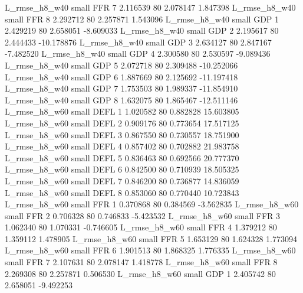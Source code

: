  L_rmse_h8_w40      small      FFR                 7 2.116539 80       2.078147           1.847398
 L_rmse_h8_w40      small      FFR                 8 2.292712 80       2.257871           1.543096
 L_rmse_h8_w40      small      GDP                 1 2.429219 80       2.658051          -8.609033
 L_rmse_h8_w40      small      GDP                 2 2.195617 80       2.444433         -10.178876
 L_rmse_h8_w40      small      GDP                 3 2.634127 80       2.847167          -7.482520
 L_rmse_h8_w40      small      GDP                 4 2.300580 80       2.530597          -9.089436
 L_rmse_h8_w40      small      GDP                 5 2.072718 80       2.309488         -10.252066
 L_rmse_h8_w40      small      GDP                 6 1.887669 80       2.125692         -11.197418
 L_rmse_h8_w40      small      GDP                 7 1.753503 80       1.989337         -11.854910
 L_rmse_h8_w40      small      GDP                 8 1.632075 80       1.865467         -12.511146
 L_rmse_h8_w60      small     DEFL                 1 1.020582 80       0.882828          15.603805
 L_rmse_h8_w60      small     DEFL                 2 0.909176 80       0.773654          17.517125
 L_rmse_h8_w60      small     DEFL                 3 0.867550 80       0.730557          18.751900
 L_rmse_h8_w60      small     DEFL                 4 0.857402 80       0.702882          21.983758
 L_rmse_h8_w60      small     DEFL                 5 0.836463 80       0.692566          20.777370
 L_rmse_h8_w60      small     DEFL                 6 0.842500 80       0.710939          18.505325
 L_rmse_h8_w60      small     DEFL                 7 0.846200 80       0.736877          14.836059
 L_rmse_h8_w60      small     DEFL                 8 0.853060 80       0.770440          10.723843
 L_rmse_h8_w60      small      FFR                 1 0.370868 80       0.384569          -3.562835
 L_rmse_h8_w60      small      FFR                 2 0.706328 80       0.746833          -5.423532
 L_rmse_h8_w60      small      FFR                 3 1.062340 80       1.070331          -0.746605
 L_rmse_h8_w60      small      FFR                 4 1.379212 80       1.359112           1.478905
 L_rmse_h8_w60      small      FFR                 5 1.653129 80       1.624328           1.773094
 L_rmse_h8_w60      small      FFR                 6 1.901513 80       1.868325           1.776335
 L_rmse_h8_w60      small      FFR                 7 2.107631 80       2.078147           1.418778
 L_rmse_h8_w60      small      FFR                 8 2.269308 80       2.257871           0.506530
 L_rmse_h8_w60      small      GDP                 1 2.405742 80       2.658051          -9.492253
